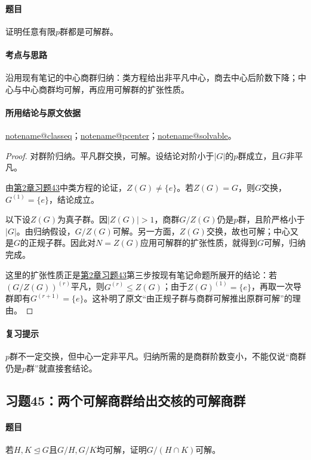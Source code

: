 \documentclass[UTF8,a4paper,11pt,fontset=windows]{ctexart}
\makeatletter
\newcommand{\noteref}[1]{\hyperref[note:#1]{\csname notename@#1\endcsname}}
\newcommand{\exref}[2]{\hyperref[ex:#1:#2]{第#1章习题#2}}
\makeatother
\begin{document}
\paragraph{题目}
证明任意有限$p$群都是可解群。

\paragraph{考点与思路}
沿用现有笔记的中心商群归纳：类方程给出非平凡中心，商去中心后阶数下降；中心与中心商群均可解，再应用可解群的扩张性质。

\paragraph{所用结论与原文依据}
\noteref{classeq}；\noteref{pcenter}；\noteref{solvable}。


\begin{proof}
对群阶归纳。平凡群交换，可解。设结论对阶小于$|G|$的$p$群成立，且$G$非平凡。

由\exref{2}{43}中类方程的论证，$Z(G)\ne\{e\}$。若$Z(G)=G$，则$G$交换，$G^{(1)}=\{e\}$，结论成立。

以下设$Z(G)$为真子群。因$|Z(G)|>1$，商群$G/Z(G)$仍是$p$群，且阶严格小于$|G|$。由归纳假设，$G/Z(G)$可解。另一方面，$Z(G)$交换，故也可解；中心又是$G$的正规子群。因此对$N=Z(G)$应用可解群的扩张性质，就得到$G$可解，归纳完成。

这里的扩张性质正是\exref{2}{43}第三步按现有笔记命题所展开的结论：若$(G/Z(G))^{(r)}$平凡，则$G^{(r)}\le Z(G)$；由于$Z(G)^{(1)}=\{e\}$，再取一次导群即有$G^{(r+1)}=\{e\}$。这补明了原文“由正规子群与商群可解推出原群可解”的理由。
\end{proof}

\paragraph{复习提示}
$p$群不一定交换，但中心一定非平凡。归纳所需的是商群阶数变小，不能仅说“商群仍是$p$群”就直接套结论。


\subsection{习题45：\texorpdfstring{两个可解商群给出交核的可解商群}{两个可解商群给出交核的可解商群}}
\label{ex:2:45}

\paragraph{题目}
若$H,K\trianglelefteq G$且$G/H,G/K$均可解，证明$G/(H\cap K)$可解。
\end{document}
